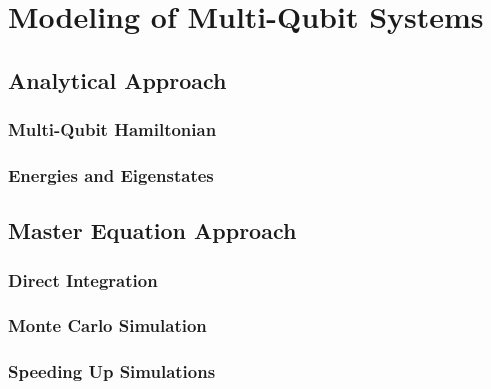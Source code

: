 \chapter{Modeling of Multi-Qubit Systems}

\section{Analytical Approach}

\subsection{Multi-Qubit Hamiltonian}

\subsection{Energies and Eigenstates}

\section{Master Equation Approach}

\subsection{Direct Integration}

\subsection{Monte Carlo Simulation}

\subsection{Speeding Up Simulations}
